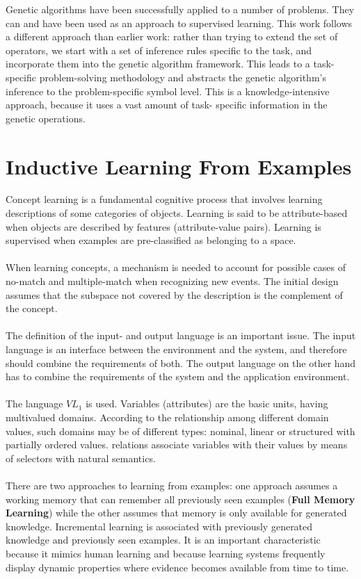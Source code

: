 \documentclass[../main.tex]{subfiles}
\begin{document}
Genetic algorithms have been successfully applied to a number of problems. They can and have been used as an approach to
supervised learning. This work follows a different approach than earlier work: rather than trying to extend the set of
operators, we start with a set of inference rules specific to the task, and incorporate them into the genetic algorithm
framework. This leads to a  task-specific problem-solving methodology and abstracts the genetic algorithm's inference to
the problem-specific symbol level. This is a knowledge-intensive approach, because it uses a vast amount of task-
specific information in the genetic operations.

\section{Inductive Learning From Examples}
Concept learning is a fundamental cognitive process that involves learning descriptions
of some categories of objects.  Learning is said to be attribute-based when objects are described by features
(attribute-value pairs). Learning is supervised when examples are pre-classified as belonging to a space.
\\\\
When learning concepts, a mechanism is needed to account for possible cases of no-match and multiple-match when
recognizing new events. The initial design assumes that the subspace not covered by the description is the complement
of the concept.
\\\\
The definition of the input- and output language is an important issue. The input language is an interface between the
environment and the system, and therefore should combine the requirements of both. The output language on the other
hand has to combine the requirements of the system and the application environment.
\\\\
The language $VL_1$ is used. Variables (attributes) are the basic units, having multivalued domains. According to the
relationship among different domain values, such domains may be of different types: nominal, linear or structured with
partially ordered values. relations associate variables with their values by means of selectors with natural semantics.
\\\\
There are two approaches to learning from examples: one approach assumes a working memory that can remember all
previously seen examples (\textbf{Full Memory Learning}) while the other assumes that memory is only available for
generated knowledge. Incremental learning is associated with previously generated knowledge and previously seen
examples. It is an important characteristic because it mimics human learning and because learning systems frequently
display dynamic properties where evidence becomes available from time to time.
\end{document}
